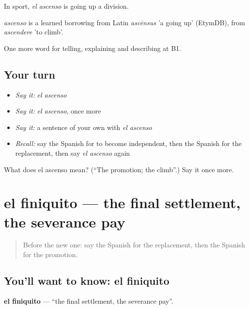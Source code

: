 In sport, \emph{el ascenso} is going up a division.

\begin{cousinweb}
\emph{ascenso} is a learned borrowing from Latin \emph{ascēnsus} 'a going up' (EtymDB), from \emph{ascendere} 'to climb'.
\end{cousinweb}

\begin{grammarlens}[title={What you've built}]
One more word for telling, explaining and describing at B1.
\end{grammarlens}

\subsection*{Your turn}
\begin{itemize}
\raggedright
  \item \emph{Say it:} \emph{el ascenso}
  \item \emph{Say it:} \emph{el ascenso}, once more
  \item \emph{Say it:} a sentence of your own with \emph{el ascenso}
  \item \emph{Recall:} say the Spanish for to become independent, then the Spanish for the replacement, then say \emph{el ascenso} again
\end{itemize}

\begin{tcolorbox}[breakable,colback=teal!4,colframe=teal!35!black,title={Before you move on}]
What does el ascenso mean? (\textquotedblleft{}The promotion; the climb\textquotedblright{}.) Say it once more.
\end{tcolorbox}
\section[el finiquito]{el finiquito — the final settlement, the severance pay}

\label{lesson:ES-C553-finiquito}



\begin{quote}
Before the new one: say the Spanish for the replacement, then the Spanish for the promotion.
\end{quote}

\subsection*{You'll want to know: el finiquito}
\textbf{el finiquito} — \textquotedblleft{}the final settlement, the severance pay\textquotedblright{}.

